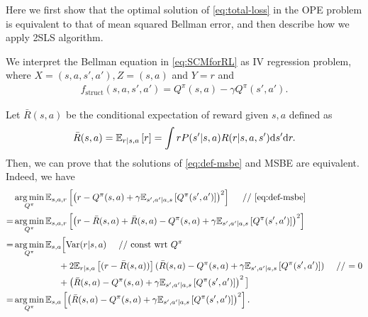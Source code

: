 Here we first show that the optimal solution of \eqref{eq:total-loss} in the OPE problem is equivalent to that of mean squared Bellman error, and then describe how we apply 2SLS algorithm.

We interpret the Bellman equation in \eqref{eq:SCMforRL} as IV regression problem, where $X = (s,a,s',a'), Z = (s,a)$ and $Y =r$ and 
\begin{align*}
    f_\mathrm{struct}(s,a,s',a') = Q^{\pi}(s,a) - \gamma Q^{\pi}(s',a').
\end{align*}    

Let $\bar R(s,a)$ be the conditional expectation of reward given $s,a$ defined as
\begin{align*}
    \bar R(s,a) = \expect[r\mid s,a]{r} = \int  r P(s'|s,a) R(r|s,a,s') \mathrm{d} s' \mathrm{d} r.
\end{align*}
Then, we can prove that the solutions of \eqref{eq:def-msbe} and MSBE are equivalent. Indeed, we have
\begin{align}
    & \argmin_{Q^\pi} \expect[s, a, r]{\left(r - Q^{\pi}(s, a) + \gamma \expect[s', a'|a,s]{Q^{\pi}(s', a')}\right)^2} ~~~~\text{// \eqref{eq:def-msbe}}  \nonumber\\
    =& \argmin_{Q^\pi} \expect[s, a, r]{\left(r - \bar R(s,a) + \bar R(s,a) - Q^{\pi}(s, a) + \gamma \expect[s', a'|a,s]{Q^{\pi}(s', a')}\right)^2} \nonumber\\
    =& \argmin_{Q^\pi} \mathbb{E}_{s, a}\Big[
    \mathrm{Var}(r|s, a) ~~~~\text{// const wrt $Q^\pi$} \nonumber\\
    & \quad\quad\quad\quad\quad 
    +2 \expect[r|s,a]{(r - \bar R(s,a))} (\bar R(s,a) - Q^{\pi}(s, a) + \gamma \expect[s', a'|a,s]{Q^{\pi}(s', a')})    ~~~~\text{// $=0$} \nonumber\\
    & \quad\quad\quad\quad\quad 
    +\left(\bar R(s,a) - Q^{\pi}(s, a) + \gamma \expect[s', a'|a,s]{Q^{\pi}(s', a')}\right)^2\big] \nonumber\\
    =& \argmin_{Q^\pi} \expect[s, a]{
    \left(\bar R(s,a) - Q^{\pi}(s, a) + \gamma \expect[s', a'|a,s]{Q^{\pi}(s', a')}\right)^2}.   
\end{align}

